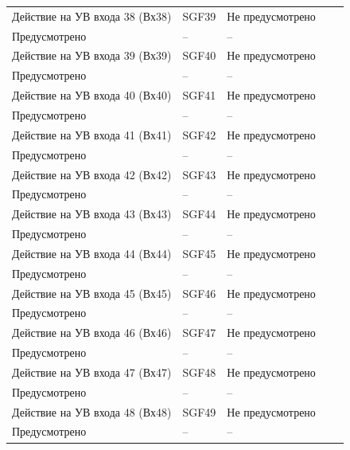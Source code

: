 \begin{longtable}{|>{\centering\arraybackslash}m{5.3cm}|>{\centering\arraybackslash}m{3.3cm}|>{\centering\arraybackslash}m{4.2cm}|>{\centering\arraybackslash}m{1.8cm}|>{\centering\arraybackslash}m{1cm}|}
\hline
\centering Действие на УВ входа 38 (Вх38)  & \centering SGF39 & \centering Не предусмотрено \\ Предусмотрено & \centering -- & \centering \arraybackslash -- \\
\hline
\centering Действие на УВ входа 39 (Вх39)  & \centering SGF40 & \centering Не предусмотрено \\ Предусмотрено & \centering -- & \centering \arraybackslash -- \\
\hline
\centering Действие на УВ входа 40 (Вх40)  & \centering SGF41 & \centering Не предусмотрено \\ Предусмотрено & \centering -- & \centering \arraybackslash -- \\
\hline
\centering Действие на УВ входа 41 (Вх41)  & \centering SGF42 & \centering Не предусмотрено \\ Предусмотрено & \centering -- & \centering \arraybackslash -- \\
\hline
\centering Действие на УВ входа 42 (Вх42)  & \centering SGF43 & \centering Не предусмотрено \\ Предусмотрено & \centering -- & \centering \arraybackslash -- \\
\hline
\centering Действие на УВ входа 43 (Вх43)  & \centering SGF44 & \centering Не предусмотрено \\ Предусмотрено & \centering -- & \centering \arraybackslash -- \\
\hline
\centering Действие на УВ входа 44 (Вх44)  & \centering SGF45 & \centering Не предусмотрено \\ Предусмотрено & \centering -- & \centering \arraybackslash -- \\
\hline
\centering Действие на УВ входа 45 (Вх45)  & \centering SGF46 & \centering Не предусмотрено \\ Предусмотрено & \centering -- & \centering \arraybackslash -- \\
\hline
\centering Действие на УВ входа 46 (Вх46)  & \centering SGF47 & \centering Не предусмотрено \\ Предусмотрено & \centering -- & \centering \arraybackslash -- \\
\hline
\centering Действие на УВ входа 47 (Вх47)  & \centering SGF48 & \centering Не предусмотрено \\ Предусмотрено & \centering -- & \centering \arraybackslash -- \\
\hline
\centering Действие на УВ входа 48 (Вх48)  & \centering SGF49 & \centering Не предусмотрено \\ Предусмотрено & \centering -- & \centering \arraybackslash -- \\

\end{longtable}

